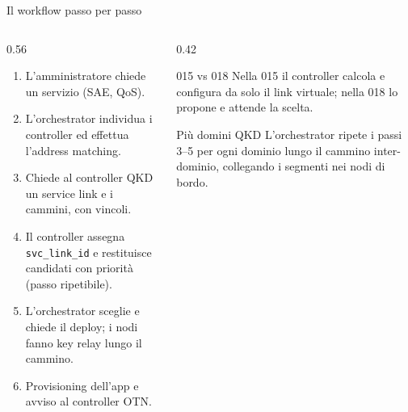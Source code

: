 \documentclass[10pt]{beamer}
\begin{document}
\begin{frame}{Il workflow passo per passo}
  \begin{columns}[T]
    \begin{column}{0.56\textwidth}
      \begin{enumerate}\small
        \item L'amministratore chiede un servizio (SAE, QoS).
        \item L'orchestrator individua i controller ed effettua
              l'address matching.
        \item Chiede al controller QKD un service link e i cammini, con
              vincoli.
        \item Il controller assegna \texttt{svc\_link\_id} e restituisce
              candidati con priorità (passo ripetibile).
        \item L'orchestrator sceglie e chiede il deploy; i nodi fanno key
              relay lungo il cammino.
        \item Provisioning dell'app e avviso al controller OTN.
      \end{enumerate}
    \end{column}
    \begin{column}{0.42\textwidth}
      \begin{block}{015 vs 018}
        \small Nella 015 il controller calcola e configura da solo il link
        virtuale; nella 018 lo \alert{propone} e attende la scelta.
      \end{block}
      \begin{block}{Più domini QKD}
        \small L'orchestrator ripete i passi 3–5 per ogni dominio lungo il
        cammino inter-dominio, collegando i segmenti nei nodi di bordo.
      \end{block}
    \end{column}
  \end{columns}
\end{frame}
\end{document}
